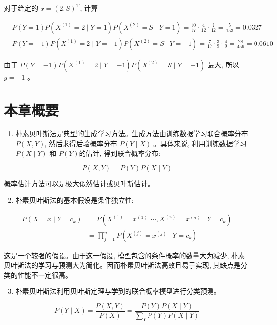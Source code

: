 \documentclass[10pt]{article}
\begin{document}
对于给定的 $x=(2, S)^{\mathrm{T}}$, 计算

$$
\begin{aligned}
& P(Y=1) P\left(X^{(1)}=2 \mid Y=1\right) P\left(X^{(2)}=S \mid Y=1\right)=\frac{10}{17} \cdot \frac{4}{12} \cdot \frac{2}{12}=\frac{5}{153}=0.0327 \\
& P(Y=-1) P\left(X^{(1)}=2 \mid Y=-1\right) P\left(X^{(2)}=S \mid Y=-1\right)=\frac{7}{17} \cdot \frac{3}{9} \cdot \frac{4}{9}=\frac{28}{459}=0.0610
\end{aligned}
$$

由于 $P(Y=-1) P\left(X^{(1)}=2 \mid Y=-1\right) P\left(X^{(2)}=S \mid Y=-1\right)$ 最大, 所以 $y=-1$ 。

\section*{本章概要}
\begin{enumerate}
  \item 朴素贝叶斯法是典型的生成学习方法。生成方法由训练数据学习联合概率分布 $P(X, Y)$, 然后求得后验概率分布 $P(Y \mid X)$ 。具体来说, 利用训练数据学习 $P(X \mid Y)$ 和 $P(Y)$的估计, 得到联合概率分布:
\end{enumerate}

$$
P(X, Y)=P(Y) P(X \mid Y)
$$

概率估计方法可以是极大似然估计或贝叶斯估计。

\begin{enumerate}
  \setcounter{enumi}{1}
  \item 朴素贝叶斯法的基本假设是条件独立性:
\end{enumerate}

$$
\begin{aligned}
P\left(X=x \mid Y=c_{k}\right) & =P\left(X^{(1)}=x^{(1)}, \cdots, X^{(n)}=x^{(n)} \mid Y=c_{k}\right) \\
& =\prod_{j=1}^{n} P\left(X^{(j)}=x^{(j)} \mid Y=c_{k}\right)
\end{aligned}
$$

这是一个较强的假设。由于这一假设, 模型包含的条件概率的数量大为减少, 朴素贝叶斯法的学习与预测大为简化。因而朴素贝叶斯法高效且易于实现, 其缺点是分类的性能不一定很高。

\begin{enumerate}
  \setcounter{enumi}{2}
  \item 朴素贝叶斯法利用贝叶斯定理与学到的联合概率模型进行分类预测。
\end{enumerate}

$$
P(Y \mid X)=\frac{P(X, Y)}{P(X)}=\frac{P(Y) P(X \mid Y)}{\sum_{Y} P(Y) P(X \mid Y)}
$$
\end{document}
